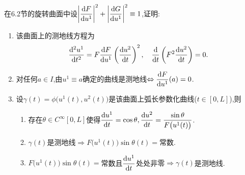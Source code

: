 	\begin{excise}
		在6.2节的旋转曲面中设$\left|\dfrac{\mathrm{d} F}{\mathrm{d} u^{1}}\right|^{2}+\left|\dfrac{\mathrm{d} G}{\mathrm{d} u^{1}}\right|^{2}\equiv 1$,证明:
		\begin{enumerate}[label= (\arabic*) ]
			\item 该曲面上的测地线方程为
			$$
			\frac{\mathrm{d}^{2}u^{1}}{\mathrm{d} t^{2}}=F\frac{\mathrm{d} F}{\mathrm{d} u^{1}}\left( \frac{\mathrm{d} u^{2}}{\mathrm{d} t} \right)^{2},\quad \frac{\mathrm{d}}{\mathrm{d} t}\left( F^{2}\frac{\mathrm{d} u^{2}}{\mathrm{d} t} \right)=0.
			$$
			\item 对任何$a\in I$,由$u^{1}\equiv a$确定的曲线是测地线$\Leftrightarrow\dfrac{\mathrm{d} F}{\mathrm{d} u^{1}}(a)=0$.
			\item 设$\gamma(t)=\phi\bigl(u^{1}(t),u^{2}(t)\bigr)$是该曲面上弧长参数化曲线($t\in[0,L]$),则
			\begin{enumerate}[label= (\alph*) ]
				\item\label{a} 存在$\theta\in C^{\infty}[0,L]$使得$\dfrac{\mathrm{d} u^{1}}{\mathrm{d} t}=\cos\theta,\dfrac{\mathrm{d} u^{2}}{\mathrm{d} t}=\dfrac{\sin\theta}{F\bigl(u^{1}(t)\bigr)}$.
				\item $\gamma(t)$是测地线$\Rightarrow F\bigl(u^{1}(t)\bigr)\sin\theta(t)=$常数.
				\item $F\bigl(u^{1}(t)\bigr)\sin\theta(t)=$常数且$\dfrac{\mathrm{d} u^{1}}{\mathrm{d} t}$处处非零$\Rightarrow \gamma(t)$是测地线.
			\end{enumerate}
		\end{enumerate}
	\end{excise}
